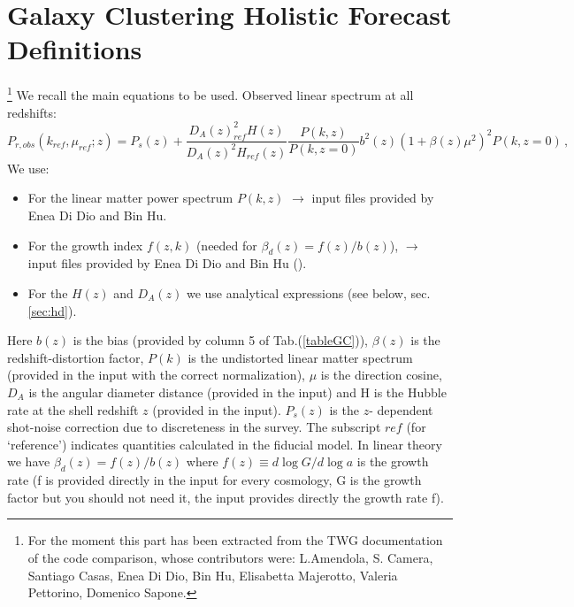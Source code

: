 \section{Galaxy Clustering Holistic Forecast Definitions}\footnote{For the moment this part has been extracted from the TWG documentation of the code comparison, whose contributors were: L.Amendola, S. Camera, Santiago Casas, Enea Di Dio, Bin Hu, Elisabetta Majerotto, Valeria Pettorino, Domenico Sapone.}
We recall the main equations to be used. Observed linear spectrum at all redshifts:
\begin{equation} \label{eq:observed-power}
P_{r,obs}(k_{ref},\mu_{ref};z)=P_{s}(z)+\frac{D_{A}(z)_{ref}^{2} H(z)}{D_A(z)^{2} H_{ref}(z)} \frac{P(k,z)}{P(k,z=0)} b^{2}(z) (1+\beta(z)\mu^{2})^{2}P(k,z=0)\,,
\end{equation}
We use:
\begin{itemize}
\item For the linear matter power spectrum $P(k,z)$ $\rightarrow$ input files provided by Enea Di Dio and Bin Hu. 
\item For the growth index $f(z,k)$ (needed for $\beta_{d}(z)=f(z)/b(z)$), $\rightarrow$ input files provided by Enea Di Dio and Bin Hu (). 
\item For the $H(z)$ and $D_A(z)$ we use analytical expressions (see below, sec. \ref{sec:hd}). 
\end{itemize}

Here $b(z)$ is the bias (provided by column 5 of Tab.(\ref{tableGC})), $\beta(z)$
is the redshift-distortion factor, $P(k)$ is the undistorted
linear matter spectrum (provided in the input with the correct normalization), $\mu$ is the
direction cosine, $D_A$ is the angular diameter distance (provided in the input)
and H is the Hubble rate at the shell redshift $z$ (provided in the input). 
$P_{s}(z)$  is the $z$- dependent shot-noise correction due to discreteness in the survey. 
The subscript $ref$ (for `reference') indicates
quantities calculated in the fiducial model. In linear theory we have
$\beta_{d}(z)=f(z)/b(z)$ where $f(z) \equiv d\log G/d\log a$ is the growth
rate (f is provided directly in the input for every cosmology, G is the growth factor but you should not need it, the input provides directly the growth rate f).

